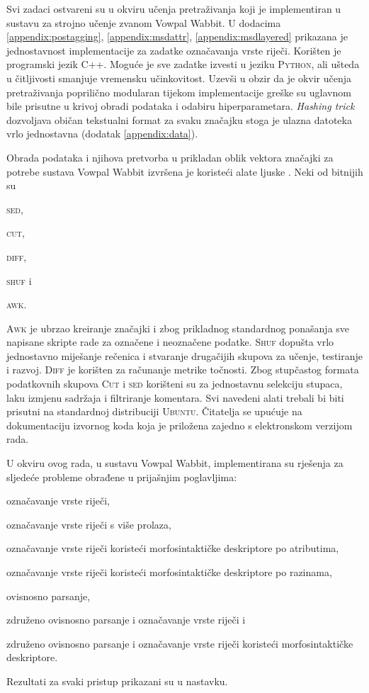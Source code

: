 Svi zadaci ostvareni su u okviru učenja pretraživanja koji je implementiran u
sustavu za strojno učenje zvanom Vowpal Wabbit. U dodacima
\ref{appendix:postagging}, \ref{appendix:msdattr}, \ref{appendix:msdlayered}
prikazana je jednostavnost implementacije za zadatke označavanja vrste riječi.
Korišten je programski jezik \textsc{C++}. Moguće je sve zadatke izvesti u
jeziku \textsc{Python}, ali ušteda u čitljivosti smanjuje vremensku
učinkovitost. Uzevši u obzir da je okvir učenja pretraživanja poprilično
modularan tijekom implementacije greške su uglavnom bile prisutne u krivoj
obradi podataka i odabiru hiperparametara. \textit{Hashing trick} dozvoljava
običan tekstualni format za svaku značajku stoga je ulazna datoteka vrlo
jednostavna (dodatak \ref{appendix:data}).

Obrada podataka i njihova pretvorba u prikladan oblik vektora značajki za
potrebe sustava Vowpal Wabbit izvršena je koristeći alate ljuske .
Neki od  bitnijih su
\begin{inlinelist}
  \item \textsc{sed},
  \item \textsc{cut},
  \item \textsc{diff},
  \item \textsc{shuf} i
  \item \textsc{awk}.
\end{inlinelist}
\textsc{Awk} je ubrzao kreiranje značajki i zbog prikladnog standardnog
ponašanja sve napisane skripte rade za označene i neoznačene podatke.
\textsc{Shuf} dopušta vrlo jednostavno miješanje rečenica i stvaranje drugačijih
skupova za učenje, testiranje i razvoj. \textsc{Diff} je korišten za računanje
metrike točnosti. Zbog stupčastog formata podatkovnih skupova \textsc{Cut} i
\textsc{sed} korišteni su za jednostavnu selekciju stupaca, laku izmjenu
sadržaja i filtriranje komentara. Svi navedeni alati trebali bi biti prisutni na
standardnoj distribuciji \textsc{Ubuntu}. Čitatelja se upućuje na dokumentaciju
izvornog koda koja je priložena zajedno s elektronskom verzijom rada.

U okviru ovog rada, u sustavu Vowpal Wabbit, implementirana su rješenja za
sljedeće probleme obrađene u prijašnjim poglavljima:
\begin{inlinelist}
  \item označavanje vrste riječi,
  \item označavanje vrste riječi s više prolaza,
  \item označavanje vrste riječi koristeći morfosintaktičke deskriptore
   po atributima,
  \item označavanje vrste riječi koristeći morfosintaktičke deskriptore po
  razinama,
  \item ovisnosno parsanje,
  \item združeno ovisnosno parsanje i označavanje vrste riječi i
  \item združeno ovisnosno parsanje i označavanje vrste riječi koristeći
  morfosintaktičke deskriptore.
\end{inlinelist}
Rezultati za svaki pristup prikazani su u nastavku.

